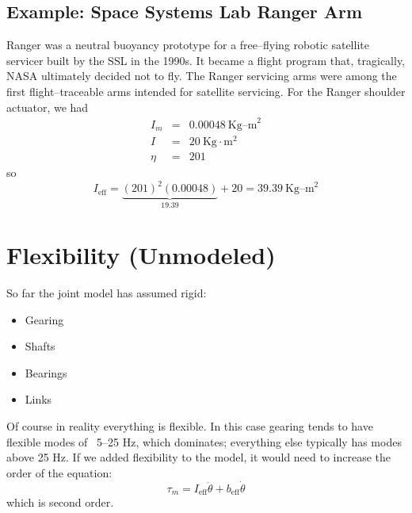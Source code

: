 \documentclass[]{article}
\begin{document}
\subsection{Example: Space Systems Lab Ranger Arm}
	Ranger was a neutral buoyancy prototype for a free--flying robotic satellite servicer built by the SSL in the 1990s. It became a flight program that, tragically, NASA ultimately decided not to fly. The Ranger servicing arms were among the first flight--traceable arms intended for satellite servicing. For the Ranger shoulder actuator, we had
\begin{eqnarray}
	I_{m} & = & 0.00048\ \text{Kg--m}^{2} \nonumber \\
	I & = & 20\ \text{Kg}\cdot \text{m}^{2} \nonumber \\
	\eta & = & 201 \nonumber
\end{eqnarray}
so
\begin{displaymath}
	I_{\text{eff}} = \underbrace{(201)^{2}(0.00048)}_{19.39} + 20 = 39.39\ \text{Kg--m}^{2}
\end{displaymath}

\pagebreak
\section{Flexibility (Unmodeled)}
So far the joint model has assumed rigid:
\begin{itemize}
	\item Gearing
	\item Shafts
	\item Bearings
	\item Links
\end{itemize}
Of course in reality everything is flexible. In this case gearing tends to have flexible modes of ~5--25 Hz, which dominates; everything else typically has modes above 25 Hz. If we added flexibility to the model, it would need to increase the order of the equation:
\begin{displaymath}
	\tau_{m} = I_{\text{eff}}\ddot{\theta} + b_{\text{eff}}\dot{\theta}
\end{displaymath}
which is second order.
\end{document}
